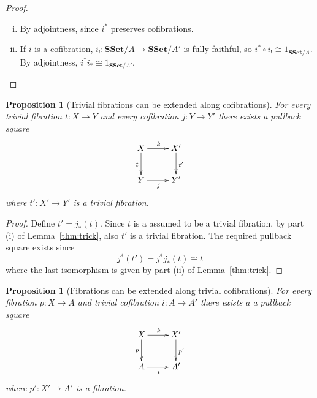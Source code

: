 \documentclass[reqno,10pt,a4paper,oneside]{amsart}
\newtheorem{proposition}[theorem]{Proposition}
\theoremstyle{definition}
\newcommand{\co}{\colon}
\newcommand{\iso}{\cong}
\newcommand{\SSet}{\mathbf{SSet}}
\begin{document}
\begin{proof} \hfill
\begin{enumerate}[(i)]
\item By adjointness, since $i^*$ preserves cofibrations.
\item If $i$ is a cofibration, $i_{!} \co \SSet/A \to \SSet/A'$ is fully faithful, so 
$i^* \circ i_{!} \iso 1_{\SSet/A}$. By adjointness, $i^* i_* \iso 1_{\SSet/A'}$. \qedhere
\end{enumerate}
\end{proof}

\begin{proposition}[Trivial fibrations can be extended along cofibrations]
 \label{thm:trivfibalongcof}
For every
trivial fibration $t \co X \to Y$ and every cofibration $j \co Y \to Y'$ there exists a pullback
square
\[
\xymatrix{
X \ar[r]^k  \ar[d]_t & X' \ar[d]^{t'} \\
Y \ar[r]_{j} & Y'}
\]
where $t' \co X' \to Y'$ is a trivial fibration. 
\end{proposition}

\begin{proof} Define $t' = j_*(t)$. Since $t$ is a assumed to be a trivial fibration, 
by part (i) of Lemma~\ref{thm:trick}, also $t'$ is a trivial fibration. The required pullback square 
exists since 
\[
j^*(t') = j^* j_* (t) \iso t 
\]
where the last isomorphism is given by part (ii) of Lemma~\ref{thm:trick}.
\end{proof}

\begin{proposition}[Fibrations can be extended along trivial cofibrations] \label{thm:joyal}  For every
fibration $p \co X \to A$ and trivial cofibration $i  \co A \to A'$ there exists a a pullback
square
\[
\xymatrix{
X \ar[r]^k \ar[d]_p & X' \ar[d]^{p'} \\
A \ar[r]_i & A'}
\]
where $p' \co X' \to A'$ is a fibration.
\end{proposition}
\end{document}
